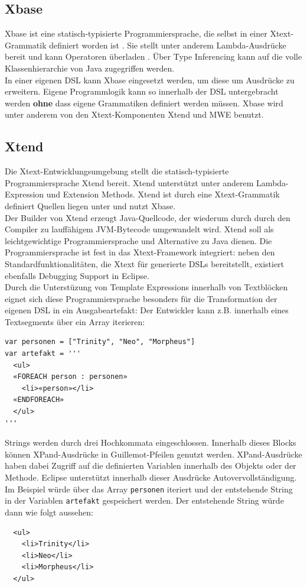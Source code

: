 \documentclass[a4paper,12pt]{scrreprt}
\begin{document}
\subsection{Xbase}
Xbase ist eine statisch-typisierte Programmiersprache, die selbst in einer Xtext-Grammatik definiert worden ist \cite{xbaseXtext}.
Sie stellt unter anderem Lambda-Ausdrücke bereit und kann Operatoren überladen \cite{xbaseIntro}. Über Type Inferencing kann auf die volle Klassenhierarchie von Java zugegriffen werden.\\
In einer eigenen DSL kann Xbase eingesetzt werden, um diese um Ausdrücke zu erweitern. Eigene Programmlogik kann so innerhalb der DSL untergebracht werden \textbf{ohne} dass eigene Grammatiken definiert werden müssen.
Xbase wird unter anderem von den Xtext-Komponenten Xtend und MWE benutzt.
\subsection{Xtend}
Die Xtext-Entwicklungsumgebung stellt die statisch-typisierte Pro\-gram\-mier\-spra\-che Xtend bereit. Xtend unterstützt unter anderem Lambda-Expression und Extension Methods. Xtend ist durch eine Xtext-Grammatik definiert Quellen liegen unter \cite{xtendXtext} und nutzt Xbase.\\
Der Builder von Xtend erzeugt Java-Quellcode, der wiederum durch durch den Compiler zu lauffähigem JVM-Bytecode umgewandelt wird.
Xtend soll als leichtgewichtige Programmiersprache und Alternative zu Java dienen. Die Programmiersprache ist fest in das Xtext-Framework integriert: neben den Stan\-dard\-funk\-tionalitäten, die Xtext für generierte DSLs bereitstellt, existiert ebenfalls Debugging Support in Eclipse.\\
Durch die Unterstüzung von Template Expressions \cite{xtendDoc} innerhalb von Textblöcken eignet sich diese Programmiersprache besonders für die Transformation der eigenen DSL in ein Ausgabeartefakt: Der Entwickler kann z.B. innerhalb eines Textsegments über ein Array iterieren:
\begin{verbatim}
var personen = ["Trinity", "Neo", "Morpheus"] 
var artefakt = '''
  <ul>
  «FOREACH person : personen»
    <li>«person»</li>
  «ENDFOREACH»
  </ul>
'''
\end{verbatim}
Strings werden durch drei Hochkommata ein\-ge\-schlossen. Innerhalb dieses Blocks können XPand-Ausdrücke in Guillemot-Pfeilen genutzt werden. XPand-Ausdrücke haben dabei Zugriff auf die definierten Variablen innerhalb des Objekts oder der Methode. Eclipse unterstützt innerhalb dieser Ausdrücke Autovervollstän\-di\-gung.\\
Im Beispiel würde über das Array \verb-personen- iteriert und der entstehende String in der Variablen \verb-artefakt- gespeichert werden. Der entstehende String würde dann wie folgt aussehen:
\begin{verbatim}
  <ul>
    <li>Trinity</li>
    <li>Neo</li>
    <li>Morpheus</li>
  </ul>
\end{verbatim}
\end{document}
